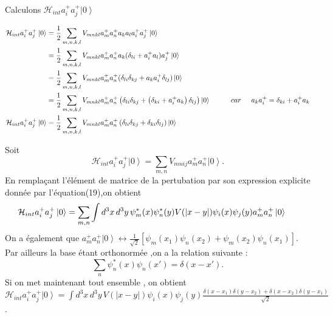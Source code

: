 \documentclass[12pt,a4paper, openany]{article}
\begin{document}
 Calculons $\mathcal{H}_{int}a_i^{+}a_j^{+}\left|0\right\rangle$ \\
\begin{center}
 $\left.\begin{aligned}
 	\mathcal{H}_{int}a_i^{+}a_j^{+}\left|0\right\rangle&=\frac{1}{2}\sum_{m,n,k,l}V_{mnkl}a^{+}_ma^{+}_na_ka_la_i^{+}a_j^{+}\left|0\right\rangle \\
 	&=\frac{1}{2}\sum_{m,n,k,l}V_{mnkl}a^{+}_ma^{+}_na_k(\delta_{li}+a^
 	{+}_ia_l)a^{+}_j\left|0\right\rangle \\
 	&=\frac{1}{2}\sum_{m,n,k,l}V_{mnkl}a^{+}_ma^{+}_n(\delta_{li}\delta_{kj}+a_ka^{+}_i\delta_{lj})\left|0\right\rangle \\
 	&=\frac{1}{2}\sum_{m,n,k,l}V_{mnkl}a^{+}_ma^{+}_n\left(\delta_{li}\delta_{kj}+\left(\delta_{ki}+a^{+}_ia_k\right)\delta_{lj}\right)\left|0\right\rangle \hspace{1cm} car\hspace{0.5cm} a_ka^{+}_i=\delta_{ki}+a^{+}_ia_k \\
 \mathcal{H}_{int}a_i^{+}a_j^{+}\left|0\right\rangle	&=\frac{1}{2}\sum_{m,n,k,l}V_{mnkl}a^{+}_ma^{+}_n\left(\delta_{li}\delta_{kj}+\delta_{ki}\delta_{lj}\right)\left|0\right\rangle \\
\end{aligned}\right.$
\end{center}
Soit 
\begin{equation}	
 	\mathcal{H}_{int}a_i^{+}a_j^{+}\left|0\right\rangle=\sum_{m,n}V_{mnij}a^{+}_ma^{+}_n\left|0\right\rangle.
\end{equation}
En remplaçant  l'élément de matrice de la pertubation par son expression explicite donnée par l'équation(19),on obtient 
\begin{equation}
\hspace{-0.5cm}	\mathcal{H}_{int}a_i^{+}a_j^{+}\left|0\right\rangle=\sum_{m,n}\int d^{3}x\,d^{3}y\,\psi_m^{*}(x)\psi_n^{*}(y)V(\left|x-y\right|){\psi}_i(x){\psi}_j(y)a_m^{+}a_n^{+}\left|0\right\rangle
\end{equation}
On a également que $a^{+}_ma^{+}_n\left|0\right\rangle\leftrightarrow{\frac{1}{\sqrt{2}}[
	{\psi}_m(x_1){\psi}_n(x_2)+{\psi}_m(x_2){\psi}_n(x_1)]} $. Par ailleurs la base étant orthonormée ,on a la relation suivante :
\begin{equation}
		\sum_{n}\psi^{*}_n(x)\psi_n(x')=\delta(x-x').
\end{equation}
Si on met maintenant tout ensemble , on obtient \\
$\mathcal{H}_{int}a_i^{+}a_j^{+}\left|0\right\rangle=\int d^{3}x\,d^{3}y\,V(\left|x-y\right|)\psi_i(x)\psi_j(y)\frac{\delta(x-x_1)\delta(y-x_2)+\delta(x-x_2)\delta(y-x_1)}{\sqrt{2}}$.\\
\end{document}
